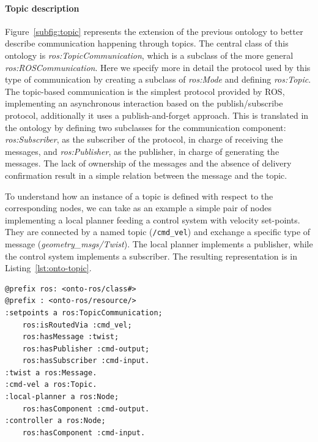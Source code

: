 \paragraph{Topic description} Figure~\ref{subfig:topic} represents the extension of the previous ontology to better describe communication happening through topics. The central class of this ontology is \textit{ros:Topic\-Com\-mu\-ni\-ca\-tion}, which is a subclass of the more general \textit{ros:ROS\-Com\-mu\-ni\-ca\-tion}. Here we specify more in detail the protocol used by this type of communication by creating a subclass of \textit{ros:Mode} and defining \textit{ros:Topic}. The topic-based communication is the simplest protocol provided by ROS, implementing an asynchronous interaction based on the publish/subscribe protocol, additionally it uses a publish-and-forget approach. This is translated in the ontology by defining two subclasses for the communication component: \textit{ros:Subscriber}, as the subscriber of the protocol, in charge of receiving the messages, and \textit{ros:Publisher}, as the publisher, in charge of generating the messages. The lack of ownership of the messages and the absence of delivery confirmation result in a simple relation between the message and the topic.

To understand how an instance of a topic is defined with respect to the corresponding nodes, we  can take as an example a simple pair of nodes implementing a local planner feeding a control system with velocity set-points. They are connected by a named topic (\texttt{/cmd\_vel}) and exchange a specific type of message (\textit{geometry\_msgs/Twist}). The local planner implements a publisher, while the control system implements a subscriber. The resulting representation is in Listing~\ref{lst:onto-topic}.

\begin{lstlisting}[frame=tb,caption={Instance of a topic-based communication according to the ontology.},label=lst:onto-topic]
@prefix ros: <onto-ros/class#>
@prefix : <onto-ros/resource/>
:setpoints a ros:TopicCommunication;
	ros:isRoutedVia :cmd_vel;
	ros:hasMessage :twist;
	ros:hasPublisher :cmd-output;
	ros:hasSubscriber :cmd-input.
:twist a ros:Message.
:cmd-vel a ros:Topic.  
:local-planner a ros:Node;
	ros:hasComponent :cmd-output.
:controller a ros:Node;
	ros:hasComponent :cmd-input.
 \end{lstlisting}

